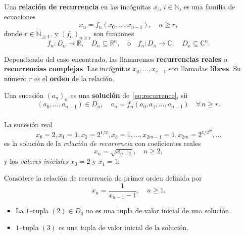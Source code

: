 \begin{frame}
\frametitle{\subsecname}

\begin{definition}
	Una \textbf{relación de recurrencia} en las incógnitas $x_{i}$, $i\in\mathds{N}$, es una familia de ecuaciones
	\begin{equation}\label{eq:recurrence}
	x_{n}=f_{n}\left(x_{0},\ldots,x_{n-1}\right),\quad n\geq r,
	\end{equation}
	donde $r\in\mathds{N}_{\geq1}$, y ${\left(f_{n}\right)}_{n\geq r}$ son funciones \[ f_{n}\colon D_{n}\rightarrow\mathds{R},\quad D_{n}\subseteq\mathds{R}^{n},\quad\text{o}\quad f_{n}\colon D_{n}\rightarrow\mathds{C},\quad D_{n}\subseteq\mathds{C}^{n}. \]

	Dependiendo del caso encontrado, las llamaremos \textbf{recurrencias reales} o \textbf{recurrencias complejas}. Las incógnitas $x_{0},\ldots,x_{r-1}$ son llamadas \textbf{libres}. Su número $r$ es el \textbf{orden} de la relación.
\end{definition}

\begin{definition}
	Una sucesión ${\left(a_{n}\right)}_{n}$ es una \textbf{solución} de~\eqref{eq:recurrence}, sii
	\begin{equation*}
	\left(a_{0},\ldots,a_{n-1}\right)\in D_{n},\quad a_{n}=f_{n}\left(a_{0},a_{1},\ldots,a_{n-1}\right)\quad\forall\,n\geq r.
	\end{equation*}
\end{definition}
\end{frame}

\begin{frame}
\frametitle{\subsecname}

\begin{example}
	La sucesión real \[ x_{0}=2, x_{1}=1, x_{2}=2^{1/2}, x_{3}=1, \ldots, x_{2m-1}=1 ,x_{2m}=2^{1/2^{m}}, \ldots \] es la solución de la \emph{relación de recurrencia} con coeficientes reales \[ x_{n}=\sqrt{x_{n-2}},\quad n\geq2, \] y los \emph{valores iniciales} $x_{0}=2$ y $x_{1}=1$.
\end{example}

\begin{example}
Considere la relación de recurrencia de primer orden definida por \[ x_{n}=\frac{1}{x_{n-1}-1},\quad n\geq1.\]
\begin{itemize}[topsep=0pt]
	\item La $1$--tupla $\left(2\right)\in D_{0}$ \alert{no es una tupla de valor inicial de una solución}.
	\item $1$--tupla $\left(3\right)$ \alert{es una tupla de valor inicial de la solución}.
\end{itemize}
\end{example}
\end{frame}

